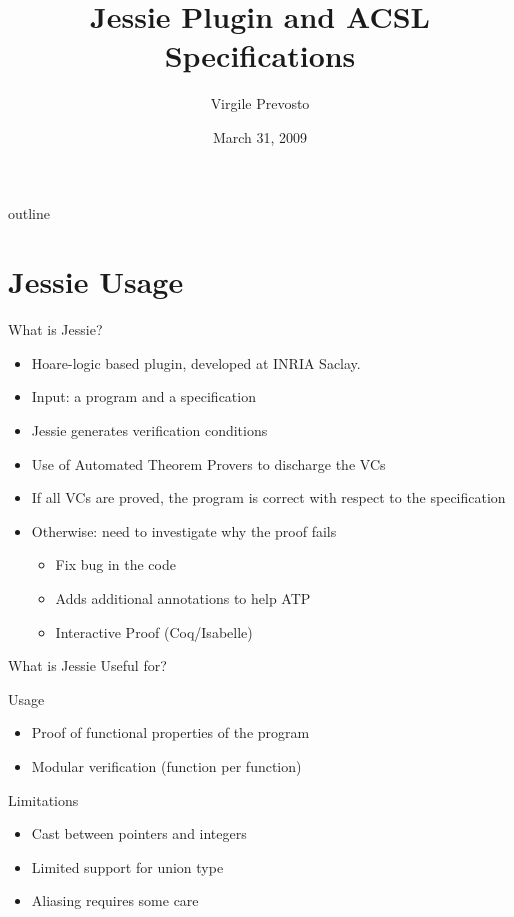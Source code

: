 \documentclass[pdf]{beamer}
\title[Frama-C training session]{Jessie Plugin and ACSL Specifications}
\author[Virgile Prevosto]{Virgile Prevosto}
\date[03-31-2009]{March 31, 2009}
\institute[CEA List]{CEA List}
\begin{document}
\begin{frame}
\titlepage
\end{frame}

\begin{frame}{outline}
\tableofcontents
\end{frame}

\section{Jessie Usage}

\begin{frame}{What is Jessie?}
\begin{itemize}
\item<+-> Hoare-logic based plugin, developed at INRIA Saclay.
\item<+-> Input: a program and a specification
\item<+-> Jessie generates \alert{verification conditions}
\item<+-> Use of \alert{Automated Theorem Provers} to discharge the VCs
\item<+-> If all VCs are proved, \alert{the program is correct} with respect
  to the specification
\item<+->Otherwise: need to investigate why the proof fails
\begin{itemize}
\item<+-> Fix bug in the code
\item<+-> Adds additional annotations to help ATP
\item<+-> Interactive Proof (Coq/Isabelle)
\end{itemize}
\end{itemize}
\end{frame}

\begin{frame}{What is Jessie Useful for?}
\begin{block}{Usage}
\begin{itemize}
\item<+-> Proof of functional properties of the program
\item<+-> Modular verification (function per function)
\end{itemize}
\end{block}
\pause
\begin{block}{Limitations}
\begin{itemize}
\item<+->Cast between pointers and integers
\item<+->Limited support for union type
\item<+->Aliasing requires some care
\end{itemize}
\end{block}
\end{frame}
\end{document}
